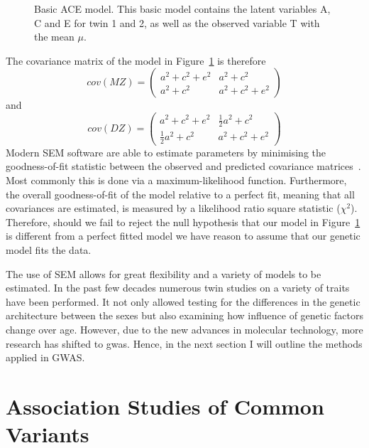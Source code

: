 \begin{figure}[htpb]
  \centering
  \scalebox{0.6}{}
  \caption[ACE Model]{
    Basic ACE model.
    This basic model contains the latent variables A, C and E for twin 1 and 2, as well as the observed variable T with the mean $\mu$.
  }\label{fig:ace}
\end{figure}

The covariance matrix of the model in Figure~\ref{fig:ace} is therefore
\begin{equation}
  cov(MZ) = 
  \begin{pmatrix}
    a^2 + c^2 + e^2 & a^2 + c^2 \\
    a^2 + c^2 & a^2 + c^2 + e^2
  \end{pmatrix}
\end{equation}
and 
\begin{equation}
  cov(DZ) = 
  \begin{pmatrix}
    a^2 + c^2 + e^2 & \frac{1}{2}a^2 + c^2 \\
    \frac{1}{2}a^2 + c^2 & a^2 + c^2 + e^2
  \end{pmatrix}
\end{equation}
Modern SEM software are able to estimate parameters by minimising the goodness-of-fit statistic between the observed and predicted covariance matrices~\cite{Boker2011}.
Most commonly this is done via a maximum-likelihood function.
Furthermore, the overall goodness-of-fit of the model relative to a perfect fit, meaning that all covariances are estimated, is measured by a likelihood ratio square statistic ($\chi^2$).
Therefore, should we fail to reject the null hypothesis that our model in Figure~\ref{fig:ace} is different from a perfect fitted model we have reason to assume that our genetic model fits the data.

The use of SEM allows for great flexibility and a variety of models to be estimated.
In the past few decades numerous twin studies on a variety of traits have been performed.
It not only allowed testing for the differences in the genetic architecture between the sexes but also examining how influence of genetic factors change over age.
However, due to the new advances in molecular technology,  more research has  shifted to \acrfull{gwas}.
Hence, in the next section I will outline the methods applied in GWAS\@.

\section{Association Studies of Common Variants}
\label{sec:association_studies_of_common_variants}

